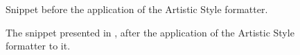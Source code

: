 \begin{figure}[!h]

\vspace{-10pt}
\caption[Snippet before the application of the Artistic Style formatter]{Snippet before the application of the Artistic Style formatter.}
\label{listings:astyle-before}
\end{figure}
\vspace{-20pt}

\begin{figure}[H]

\vspace{-10pt}
\caption[Snippet after the application of the Artistic Style formatter]{The snippet presented in , after the application of the Artistic Style formatter to it.}
\label{listings:astyle-after}
\end{figure}
\vspace{-30pt}
